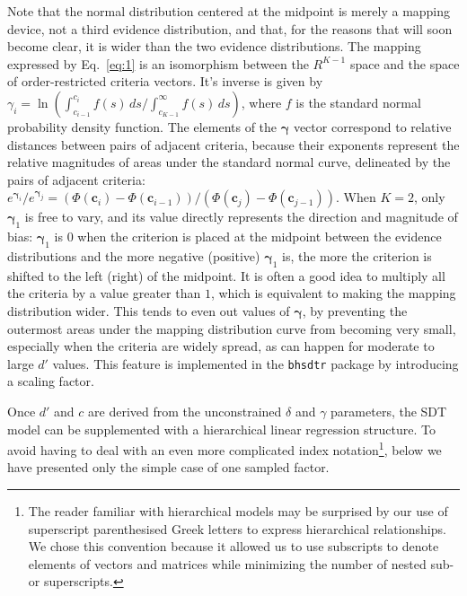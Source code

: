 \documentclass[oneside,a4paper]{article}
\begin{document}
Note that the normal distribution centered at the midpoint is merely a
mapping device, not a third evidence distribution, and that, for the
reasons that will soon become clear, it is wider than the two evidence
distributions. The mapping expressed by Eq.~\ref{eq:1} is an
isomorphism between the $R^{K-1}$ space and the space of
order-restricted criteria vectors. It's inverse is given by
$\gamma_i =\ln{(\int_{c_{i-1}}^{c_i} f(s) \,ds /
  \int_{c_{K-1}}^{\infty} f(s) \, ds)}$, where $f$ is the standard
normal probability density function. The elements of the $\bm{\gamma}$
vector correspond to relative distances between pairs of adjacent
criteria, because their exponents represent the relative
magnitudes of areas under the standard normal curve, delineated by the
pairs of adjacent criteria:
$e^{\bm{\gamma}_i} / e^{\bm{\gamma}_j} = (\Phi(\bm{c}_i) -
\Phi(\bm{c}_{i-1})) / (\Phi(\bm{c}_j) - \Phi(\bm{c}_{j-1}))$. When
$K=2$, only $\bm{\gamma}_1$ is free to vary, and its value directly
represents the direction and magnitude of bias: $\bm{\gamma}_1$ is $0$
when the criterion is placed at the midpoint between the evidence
distributions and the more negative (positive) $\bm{\gamma}_1$ is, the
more the criterion is shifted to the left (right) of the midpoint. It
is often a good idea to multiply all the criteria by a value greater
than $1$, which is equivalent to making the mapping distribution
wider. This
tends to even out values of $\bm{\gamma}$, by preventing the outermost
areas under the mapping distribution curve from becoming very small,
especially when the criteria are widely spread, as can happen for
moderate to large $d'$ values. This feature is implemented in the
\texttt{bhsdtr} package by introducing a scaling factor.

Once $d'$ and $c$ are derived from the unconstrained $\delta$ and
$\gamma$ parameters, the SDT model can be supplemented with a
hierarchical linear regression structure. To avoid having to deal with
an even more complicated index notation\footnote{The reader familiar
  with hierarchical models may be surprised by our use of superscript
  parenthesised Greek letters to express hierarchical
  relationships. We chose this convention because it allowed us to use
  subscripts to denote elements of vectors and matrices while
  minimizing the number of nested sub- or superscripts.}, below we
have presented only the simple case of one sampled factor.
\end{document}

